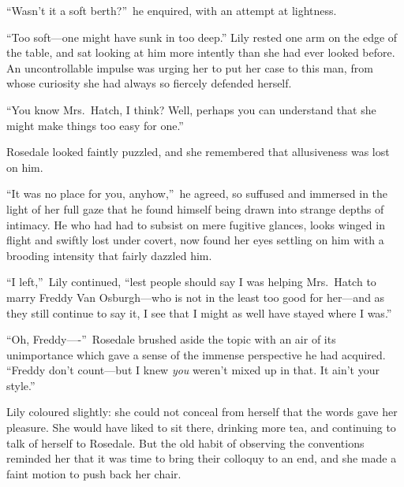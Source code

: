 \documentclass[12pt,a4paper]{book}
\begin{document}
``Wasn't it a soft berth?''\ he enquired, with an attempt at
lightness.





``Too soft---one might have sunk in too deep.'' Lily rested one arm
on the edge of the table, and sat looking at him more intently
than she had ever looked before. An uncontrollable impulse was
urging her to put her case to this man, from whose curiosity she
had always so fiercely defended herself.





``You know Mrs.\ Hatch, I think? Well, perhaps you can understand
that she might make things too easy for one.''





Rosedale looked faintly puzzled, and she remembered that
allusiveness was lost on him.





``It was no place for you, anyhow,''\ he agreed, so suffused and
immersed in the light of her full gaze that he found himself
being drawn into strange depths of intimacy. He who had had to
subsist on mere fugitive glances, looks winged in flight and
swiftly lost under covert, now found her eyes settling on him
with a brooding intensity that fairly dazzled him.





``I left,''\ Lily continued, ``lest people should say I was helping
Mrs.\ Hatch to marry Freddy Van Osburgh---who is not in the least
too good for her---and as they still continue to say it, I see
that I might as well have stayed where I was.''





``Oh, Freddy----''\ Rosedale brushed aside the topic with an air of
its unimportance which gave a sense of the immense perspective he
had acquired. ``Freddy don't count---but I knew \textit{you} weren't mixed
up in that. It ain't your style.''





Lily coloured slightly: she could not conceal from herself that
the words gave her pleasure. She would have liked to sit there,
drinking more tea, and continuing to talk of herself to Rosedale. 
But the old habit of observing the conventions reminded her that
it was time to bring their colloquy to an end, and she made a
faint motion to push back her chair.
\end{document}

